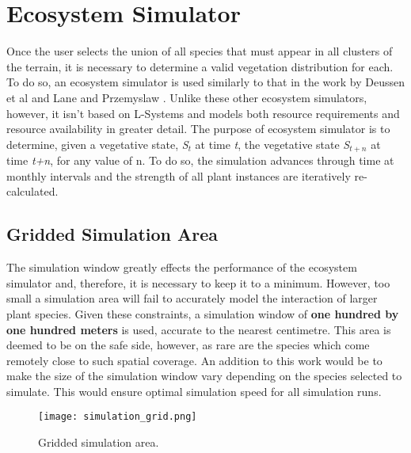 \section{Ecosystem Simulator} \label{sec:ecosystem_simulator}

Once the user selects the union of all species that must appear in all clusters of the terrain, it is necessary to determine a valid vegetation distribution for each. To do so, an ecosystem simulator is used similarly to that in the work by Deussen et al \cite{Deussen1998} and Lane and Przemyslaw \cite{Lane2002}. Unlike these other ecosystem simulators, however, it isn't based on L-Systems and models both resource requirements and resource availability in greater detail. The purpose of ecosystem simulator is to determine, given a vegetative state, \textit{S$_{t}$} at time \textit{t}, the vegetative state \textit{S$_{t+n}$} at time \textit{t+n}, for any value of n. To do so, the simulation advances through time at monthly intervals and the strength of all plant instances are iteratively re-calculated. \\

\subsection{Gridded Simulation Area}

The simulation window greatly effects the performance of the ecosystem simulator and, therefore, it is necessary to keep it to a minimum. However, too small a simulation area will fail to accurately model the interaction of larger plant species. Given these constraints, a simulation window of \textbf{one hundred by one hundred meters} is used, accurate to the nearest centimetre. This area is deemed to be on the safe side, however, as rare are the species which come remotely close to such spatial coverage. An addition to this work would be to make the size of the simulation window vary depending on the  species selected to simulate. This would ensure optimal simulation speed for all simulation runs. \\

\begin{figure}
\center
	\texttt{[image: simulation\_grid.png]}
	\caption{ Gridded simulation area.}	
	\label{fig:simulation_grid}
\end{figure}

